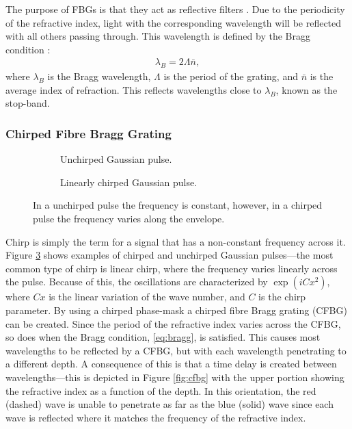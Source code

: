 The purpose of FBGs is that they act as reflective filters \cite{agrawal2002, alazzawi, ferreira, starodoumov}. Due to the periodicity of the refractive index, light with the corresponding wavelength will be reflected with all others passing through. This wavelength is defined by the Bragg condition \cite{agrawal2002, alazzawi, becker, ferreira, silfvast, starodoumov}:
\begin{align}
\label{eq:bragg}
\lambda_B = 2 \Lambda \bar{n},
\end{align}
where $\lambda_B$ is the Bragg wavelength, $\Lambda$ is the period of the grating, and $\bar{n}$ is the average index of refraction. This reflects wavelengths close to $\lambda_B$, known as the stop-band. \\

\subsubsection{Chirped Fibre Bragg Grating}
\begin{figure}[tbp]
\begin{subfigure}{0.5\textwidth}

\caption{Unchirped Gaussian pulse.}
\label{fig:unchirped}
\end{subfigure}
\begin{subfigure}{0.5\textwidth}

\caption{Linearly chirped Gaussian pulse.}
\label{fig:chirped}
\end{subfigure}
\caption[Comparison of a chirped and unchirped Gaussian pulse.]{In a unchirped pulse the frequency is constant, however, in a chirped pulse the frequency varies along the envelope.}
\label{fig:chirp}
\end{figure}

Chirp is simply the term for a signal that has a non-constant frequency across it. Figure \ref{fig:chirp} shows examples of chirped and unchirped Gaussian pulses---the most common type of chirp is linear chirp, where the frequency varies linearly across the pulse. Because of this, the oscillations are characterized by $\exp \left( i C x^2 \right)$, where $C x$ is the linear variation of the wave number, and $C$ is the chirp parameter. By using a chirped phase-mask a chirped fibre Bragg grating (CFBG) can be created. Since the period of the refractive index varies across the CFBG, so does when the Bragg condition, \eqref{eq:bragg}, is satisfied. This causes most wavelengths to be reflected by a CFBG, but with each wavelength penetrating to a different depth. A consequence of this is that a time delay is created between wavelengths---this is depicted in Figure \ref{fig:cfbg} with the upper portion showing  the refractive index as a function of the depth. In this orientation, the red (dashed) wave is unable to penetrate as far as the blue (solid) wave since each wave is reflected where it matches the frequency of the refractive index.  \\

